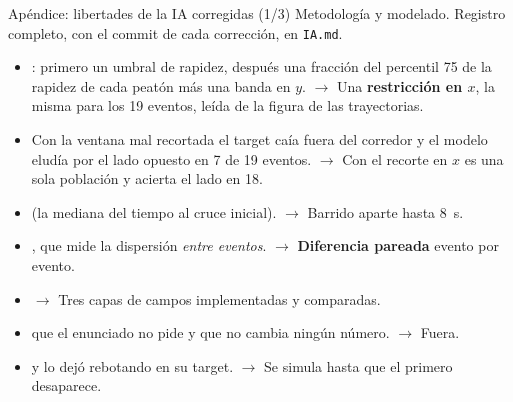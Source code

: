 \documentclass[aspectratio=169,11pt]{beamer}
\begin{document}
\begin{frame}[noframenumbering]{Apéndice: libertades de la IA corregidas (1/3)}
    \vspace{-0.2em}
    {\scriptsize\color{gris} Metodología y modelado. Registro completo, con el
     commit de cada corrección, en \texttt{IA.md}.}
    \vspace{0.2em}
    \footnotesize
    \begin{itemize}\setlength{\itemsep}{0.22em}
        \item {}: primero un umbral de rapidez, después una fracción del
              percentil 75 de la rapidez de cada peatón más una banda en $y$.
              $\to$ Una \textbf{restricción en $x$}, la misma para los 19 eventos,
              leída de la figura de las trayectorias.
        \item {} Con la ventana mal recortada el target
              caía fuera del corredor y el modelo eludía por el lado opuesto en 7
              de 19 eventos. $\to$ Con el recorte en $x$ es una sola población y
              acierta el lado en 18.
        \item {}
              (la mediana del tiempo al cruce inicial). $\to$ Barrido aparte
              hasta \SI{8}{\second}.
        \item {}, que mide la dispersión \emph{entre eventos}.
              $\to$ \textbf{Diferencia pareada} evento por evento.
        \item {}
              $\to$ Tres capas de campos implementadas y comparadas.
        \item {} que el
              enunciado no pide y que no cambia ningún número. $\to$ Fuera.
        \item {} y lo dejó rebotando en su
              target. $\to$ Se simula hasta que el primero desaparece.
    \end{itemize}
\end{frame}
\end{document}
